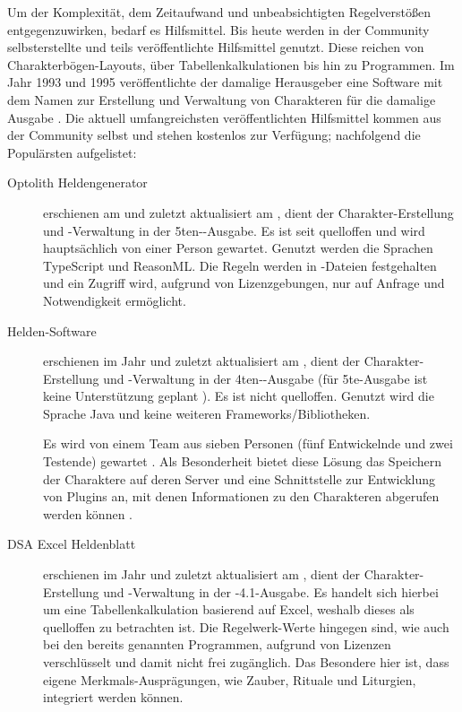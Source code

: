 Um der Komplexität, dem Zeitaufwand und unbeabsichtigten Regelverstößen entgegenzuwirken, bedarf es Hilfsmittel.
Bis heute werden in der Community selbsterstellte und teils veröffentlichte Hilfsmittel genutzt.
Diese reichen von Charakterbögen-Layouts, über Tabellenkalkulationen bis hin zu Programmen. %
Im Jahr 1993 und 1995 veröffentlichte der damalige Herausgeber eine Software mit dem Namen  zur Erstellung und Verwaltung von Charakteren für die damalige Ausgabe .
Die aktuell umfangreichsten veröffentlichten Hilfsmittel kommen aus der Community selbst und stehen kostenlos zur Verfügung; nachfolgend die Populärsten aufgelistet:
\begin{description}
    \item[Optolith Heldengenerator] erschienen am  und zuletzt aktualisiert am , dient der Charakter-Erstellung und -Verwaltung in der 5ten--Ausgabe.
    Es ist seit  quelloffen und wird hauptsächlich von einer Person gewartet.
    Genutzt werden die Sprachen TypeScript und ReasonML.
    Die Regeln werden in -Dateien festgehalten und ein Zugriff wird, aufgrund von Lizenzgebungen, nur auf Anfrage und Notwendigkeit ermöglicht.

    \item[Helden-Software] erschienen im Jahr  und zuletzt aktualisiert am , dient der Charakter-Erstellung und -Verwaltung in der 4ten--Ausgabe (für 5te-Ausgabe ist keine Unterstützung geplant ).
    Es ist nicht quelloffen.
    Genutzt wird die Sprache Java und keine weiteren Frameworks/Bibliotheken. 

    Es wird von einem Team aus sieben Personen (fünf Entwickelnde und zwei Testende) gewartet .
    Als Besonderheit bietet diese Lösung das Speichern der Charaktere auf deren Server und eine Schnittstelle zur Entwicklung von Plugins an, mit denen Informationen zu den Charakteren abgerufen werden können .

    \item[DSA Excel Heldenblatt] erschienen im Jahr  und zuletzt aktualisiert am , dient der Charakter-Erstellung und -Verwaltung in der -4.1-Ausgabe.
    Es handelt sich hierbei um eine Tabellenkalkulation basierend auf Excel, weshalb dieses als quelloffen zu betrachten ist.
    Die Regelwerk-Werte hingegen sind, wie auch bei den bereits genannten Programmen, aufgrund von Lizenzen verschlüsselt und damit nicht frei zugänglich.
    Das Besondere hier ist, dass eigene Merkmals-Ausprägungen, wie \zB Zauber, Rituale und Liturgien, integriert werden können.


\end{description}
